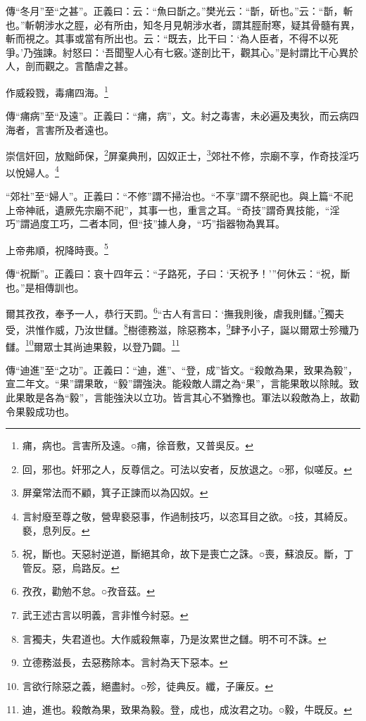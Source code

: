 {\noindent\zhuan{}\fzbyks 傳“冬月”至“之甚”。正義曰：云：“魚曰斮之。”樊光云：“斮，斫也。”云：“斮，斬也。”斬朝涉水之脛，必有所由，知冬月見朝涉水者，謂其脛耐寒，疑其骨髓有異，斬而視之。其事或當有所出也。云：“既去，比干曰：‘為人臣者，不得不以死爭。’乃強諫。紂怒曰：‘吾聞聖人心有七竅。’遂剖比干，觀其心。”是紂謂比干心異於人，剖而觀之。言酷虐之甚。 \par}

作威殺戮，毒痡四海。\footnote{痡，病也。言害所及遠。○痡，徐音敷，又普吳反。}

{\noindent\zhuan{}\fzbyks 傳“痡病”至“及遠”。正義曰：“痡，病”，文。紂之毒害，未必遍及夷狄，而云病四海者，言害所及者遠也。 \par}

崇信奸回，放黜師保，\footnote{回，邪也。奸邪之人，反尊信之。可法以安者，反放退之。○邪，似嗟反。}屏棄典刑，囚奴正士，\footnote{屏棄常法而不顧，箕子正諫而以為囚奴。}郊社不修，宗廟不享，作奇技淫巧以悅婦人。\footnote{言紂廢至尊之敬，營卑褻惡事，作過制技巧，以恣耳目之欲。○技，其綺反。褻，息列反。}

{\noindent\shu{}\fzkt “郊社”至“婦人”。正義曰：“不修”謂不掃治也。“不享”謂不祭祀也。與上篇“不祀上帝神祇，遺厥先宗廟不祀”，其事一也，重言之耳。“奇技”謂奇異技能，“淫巧”謂過度工巧，二者本同，但“技”據人身，“巧”指器物為異耳。 \par}

上帝弗順，祝降時喪。\footnote{祝，斷也。天惡紂逆道，斷絕其命，故下是喪亡之誅。○喪，蘇浪反。斷，丁管反。惡，烏路反。}

{\noindent\zhuan{}\fzbyks 傳“祝斷”。正義曰：哀十四年云：“子路死，子曰：‘天祝予！’”何休云：“祝，斷也。”是相傳訓也。 \par}

爾其孜孜，奉予一人，恭行天罰。\footnote{孜孜，勸勉不怠。○孜音茲。}“古人有言曰：‘撫我則後，虐我則讎。’\footnote{武王述古言以明義，言非惟今紂惡。}獨夫受，洪惟作威，乃汝世讎。\footnote{言獨夫，失君道也。大作威殺無辜，乃是汝累世之讎。明不可不誅。}樹德務滋，除惡務本，\footnote{立德務滋長，去惡務除本。言紂為天下惡本。}肆予小子，誕以爾眾士殄殲乃讎。\footnote{言欲行除惡之義，絕盡紂。○殄，徒典反。纖，子廉反。}爾眾士其尚迪果毅，以登乃闢。\footnote{迪，進也。殺敵為果，致果為毅。登，成也，成汝君之功。○毅，牛既反。}

{\noindent\zhuan{}\fzbyks 傳“迪進”至“之功”。正義曰：“迪，進”、“登，成”皆文。“殺敵為果，致果為毅”，宣二年文。“果”謂果敢，“毅”謂強決。能殺敵人謂之為“果”，言能果敢以除賊。致此果敢是各為“毅”，言能強決以立功。皆言其心不猶豫也。軍法以殺敵為上，故勸令果毅成功也。 \par}

